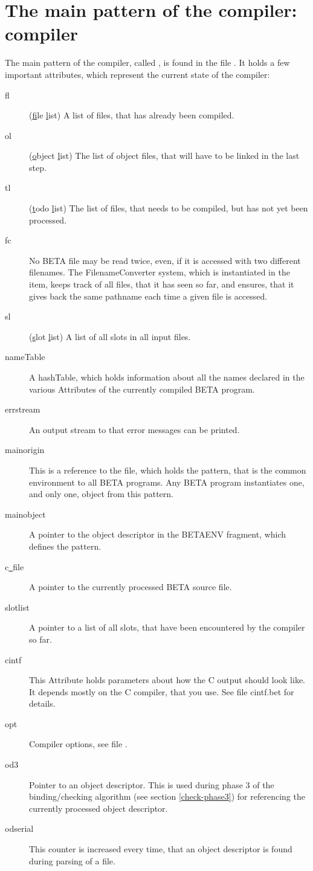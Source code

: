 \section{The main pattern of the compiler: compiler}
The main pattern of the compiler, called , is found in
the file .  It holds a few important attributes,
which represent the current state of the compiler:
\begin{description}
\item[fl] (\underline{f}ile \underline{l}ist) A list of files, that
        has already been compiled.
\item[ol] (\underline{o}bject \underline{l}ist) The list of object
        files, that will have to be linked in the last step.
\item[tl] (\underline{t}odo \underline{l}ist) The list of files,
        that needs to be compiled, but has not yet been processed.
\item[fc] No BETA file may be read twice, even, if it is accessed
	with two different filenames.  The FilenameConverter system,
	which is instantiated in the  item, keeps
	track of all files, that it has seen so far, and ensures,
	that it gives back the same pathname each time a given
	file is accessed.
\item[sl] (\underline{s}lot \underline{l}ist) A list of all slots
	in all input files.
\item[nameTable] A hashTable, which holds information about all the
	names declared in the various Attributes of the currently
	compiled BETA program.
\item[errstream] An output stream to that error messages can be
	printed.
\item[mainorigin] This is a reference to the file, which holds the
	 pattern, that is the
	common environment to all BETA programs.  Any BETA
	program instantiates one, and only one, object from this
	pattern.
\item[mainobject] A pointer to the object descriptor in the
	BETAENV fragment, which defines the  pattern.
\item[c\underline{\ }file] A pointer to the currently processed BETA source file.
\item[slotlist] A pointer to a list of all slots, that have been
	encountered by the compiler so far.
\item[cintf] This Attribute holds parameters about how the C output
	should look like.  It depends mostly on the C compiler, that
	you use.  See file cintf.bet for details.
\item[opt] Compiler options, see file .
\item[od3] Pointer to an object descriptor.  This is used during
	phase 3 of the binding/checking algorithm (see
	section \ref{check-phase3}) for referencing the
	currently processed object descriptor.
\item[odserial] This counter is increased every time, that an
	object descriptor is found during parsing of a file.
\end{description}


